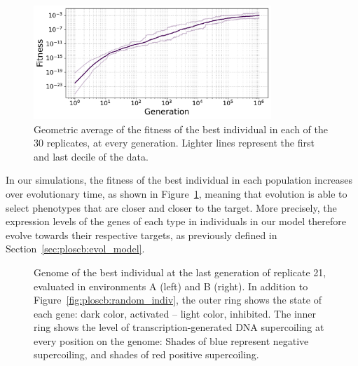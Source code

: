 \begin{figure}[H]
\centering
\hspace{-1.2cm}
\includegraphics[width=0.8\textwidth]{ploscb/img/all_fitness.pdf}
\caption[Average fitness during evolution in the advanced model]{Geometric average of the fitness of the best individual in each of the 30 replicates, at every generation.
Lighter lines represent the first and last decile of the data.}
\label{fig:ploscb:main_fitness}
\end{figure}

In our simulations, the fitness of the best individual in each population increases over evolutionary time, as shown in Figure~\ref{fig:ploscb:main_fitness}, meaning that evolution is able to select phenotypes that are closer and closer to the target. More precisely, the expression levels of the genes of each type in individuals in our model therefore evolve towards their respective targets, as previously defined in Section~\ref{sec:ploscb:evol_model}.

\begin{figure}[H]
\centering
\begin{elasticrow}[width=\textwidth]
\end{elasticrow}
\caption[Best individual at the end of evolution in one of the replicates in the advanced model, in both environments]{Genome of the best individual at the last generation of replicate 21, evaluated in environments A (left) and B (right).
In addition to Figure~\ref{fig:ploscb:random_indiv}, the outer ring shows the state of each gene: dark color, activated -- light color, inhibited.
The inner ring shows the level of transcription-generated DNA supercoiling at every position on the genome: Shades of blue represent negative supercoiling, and shades of red positive supercoiling.}
\label{fig:ploscb:genomes}
\end{figure}

